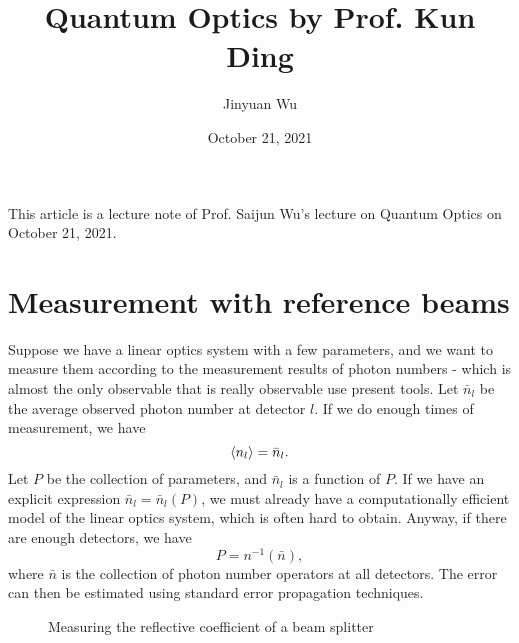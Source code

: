 \documentclass[hyperref, a4paper]{article}
\title{Quantum Optics by Prof. Kun Ding}
\author{Jinyuan Wu}
\date{October 21, 2021}
\begin{document}
\maketitle

This article is a lecture note of Prof. Saijun Wu's lecture on Quantum Optics on October 21, 2021.

\section{Measurement with reference beams}

Suppose we have a linear optics system with a few parameters, 
and we want to measure them according to the measurement results of photon numbers
- which is almost the only observable that is really observable use present tools.
Let $\bar{n}_l$ be the average observed photon number at detector $l$. 
If we do enough times of measurement, we have 
\begin{equation}
    \expval{n_l} = \bar{n}_l.
\end{equation}
Let $P$ be the collection of parameters, and $\bar{n}_l$ is a function of $P$.
If we have an explicit expression $\bar{n}_l = \bar{n}_l(P)$, we must already have a computationally efficient model of the linear optics system, which is often hard to obtain.
Anyway, if there are enough detectors, we have 
\begin{equation}
    P = n^{-1}(\bar{n}),
\end{equation}
where $\bar{n}$ is the collection of photon number operators at all detectors.
The error can then be estimated using standard error propagation techniques.

\begin{figure}
    \centering
    
    \caption{Measuring the reflective coefficient of a beam splitter}
    \label{fig:measure-mean-splitter}
\end{figure}
\end{document}
